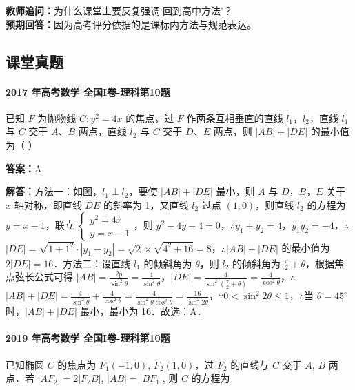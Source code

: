 \documentclass[UTF8,a4paper,11pt]{ctexart}
\begin{document}
\noindent\textbf{教师追问：}为什么课堂上要反复强调‘回到高中方法’？\\

\textbf{预期回答：}因为高考评分依据的是课标内方法与规范表达。\par

\subsection*{课堂真题}

\paragraph{2017 年高考数学 全国I卷-理科第10题}

已知 $F$ 为抛物线 $C:y^2=4x$ 的焦点，过 $F$ 作两条互相垂直的直线 $l_1$，$l_2$，直线 $l_1$ 与 $C$ 交于 $A$、$B$ 两点，直线 $l_2$ 与 $C$ 交于 $D$、$E$ 两点，则 $|AB|+|DE|$ 的最小值为（ ）

\textbf{答案：}A\par

\textbf{解答：}方法一：如图，$l_1\perp l_2$，要使 $|AB|+|DE|$ 最小，则 $A$ 与 $D$，$B$，$E$ 关于 $x$ 轴对称，即直线 $DE$ 的斜率为 1，又直线 $l_2$ 过点 $(1,0)$，则直线 $l_2$ 的方程为 $y=x-1$，联立 $\begin{cases} y^2=4x \\ y=x-1 \end{cases}$，则 $y^2-4y-4=0$，\ensuremath{\therefore}$y_1+y_2=4$，$y_1y_2=-4$，\ensuremath{\therefore}$|DE|=\sqrt{1+1^2}\cdot|y_1-y_2|=\sqrt{2}\times\sqrt{4^2+16}=8$，\ensuremath{\therefore}$|AB|+|DE|$ 的最小值为 $2|DE|=16$．方法二：设直线 $l_1$ 的倾斜角为 $\theta$，则 $l_2$ 的倾斜角为 $\frac{\pi}{2}+\theta$，根据焦点弦长公式可得 $|AB|=\frac{2p}{\sin^2\theta}=\frac{4}{\sin^2\theta}$，$|DE|=\frac{4}{\sin^2(\frac{\pi}{2}+\theta)}=\frac{4}{\cos^2\theta}$，\ensuremath{\therefore}$|AB|+|DE|=\frac{4}{\sin^2\theta}+\frac{4}{\cos^2\theta}=\frac{4}{\sin^2\theta\cos^2\theta}=\frac{16}{\sin^2 2\theta}$，\ensuremath{\because}$0<\sin^2 2\theta\leq 1$，\ensuremath{\therefore}当 $\theta=45^\circ$ 时，$|AB|+|DE|$ 最小，最小为 16．故选：A．

\paragraph{2019 年高考数学 全国I卷-理科第10题}

已知椭圆 $C$ 的焦点为 $F_1(-1, 0)$, $F_2(1, 0)$，过 $F_2$ 的直线与 $C$ 交于 $A$, $B$ 两点．若 $|AF_2| = 2|F_2B|$, $|AB| = |BF_1|$, 则 $C$ 的方程为
\end{document}
